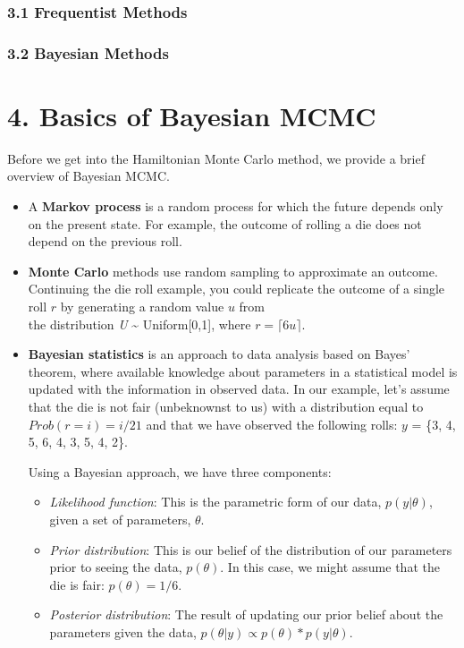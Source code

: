 \documentclass[
]{article}
\begin{document}
\hypertarget{frequentist-methods}{%
\subsubsection{3.1 Frequentist Methods}\label{frequentist-methods}}

\hypertarget{bayesian-methods}{%
\subsubsection{3.2 Bayesian Methods}\label{bayesian-methods}}

\hypertarget{basics-of-bayesian-mcmc}{%
\section{4. Basics of Bayesian MCMC}\label{basics-of-bayesian-mcmc}}

Before we get into the Hamiltonian Monte Carlo method, we provide a
brief overview of Bayesian MCMC.

\begin{itemize}
\item
  A \textbf{Markov process} is a random process for which the future
  depends only on the present state. For example, the outcome of rolling
  a die does not depend on the previous roll.
\item
  \textbf{Monte Carlo} methods use random sampling to approximate an
  outcome. Continuing the die roll example, you could replicate the
  outcome of a single roll \(r\) by generating a random value \(u\)
  from\\
  the distribution \emph{U} \textasciitilde{} Uniform{[}0,1{]}, where
  \(r=\)\(\lceil\)\(6u\)\(\rceil\).
\item
  \textbf{Bayesian statistics} is an approach to data analysis based on
  Bayes' theorem, where available knowledge about parameters in a
  statistical model is updated with the information in observed data. In
  our example, let's assume that the die is not fair (unbeknownst to us)
  with a distribution equal to \(Prob(r = i) = i/21\) and that we have
  observed the following rolls: \(y\) = \{3, 4, 5, 6, 4, 3, 5, 4, 2\}.

  Using a Bayesian approach, we have three components:

  \begin{itemize}
  \item
    \emph{Likelihood function}: This is the parametric form of our data,
    \(p(y|\theta)\), given a set of parameters, \(\theta\).
  \item
    \emph{Prior distribution}: This is our belief of the distribution of
    our parameters prior to seeing the data, \(p(\theta)\). In this
    case, we might assume that the die is fair: \(p(\theta) = 1/6\).
  \item
    \emph{Posterior distribution}: The result of updating our prior
    belief about the parameters given the data,
    \(p(\theta|y) \propto p(\theta) * p(y|\theta)\).
  \end{itemize}
\end{itemize}
\end{document}

